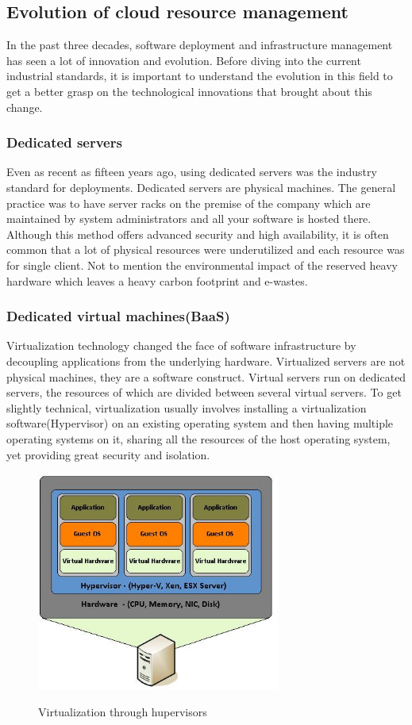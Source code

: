 \documentclass[12pt,titlepage]{article}
\begin{document}
\subsection{Evolution of cloud resource management}
\label{sec:org91b7f4b}
In the past three decades, software deployment and infrastructure management has
seen a lot of innovation and evolution. Before diving into the current
industrial standards, it is important to understand the evolution in this field
to get a better grasp on the technological innovations that brought about this change.


\subsubsection{Dedicated servers}
\label{sec:orgb81bdb6}
Even as recent as fifteen years ago, using dedicated servers was the industry standard for deployments. Dedicated servers
are physical machines. The general practice was to have server racks on the premise
of the company which are maintained by system administrators and all your
software is
hosted there. Although this method offers advanced security and high
availability, it is often common that a lot of physical resources were
underutilized and each resource was for single client. Not to mention the
environmental impact of the reserved heavy hardware which leaves a heavy carbon
footprint and e-wastes.


\subsubsection{Dedicated virtual machines(BaaS)}
\label{sec:org3fd3c95}
Virtualization technology changed the face of software infrastructure by decoupling
applications from the underlying hardware. Virtualized servers are not physical
machines, they are a software construct. Virtual servers run on dedicated
servers, the resources of which are divided between several virtual servers.
To get slightly technical, virtualization usually involves installing a virtualization software(Hypervisor) on an
existing operating system and then having multiple operating systems on it,
sharing all the resources of the host operating system, yet providing
great security and isolation.

\begin{figure}[!h]
    \caption{Virtualization through hupervisors}
    \centering
    \includegraphics[width=80mm]{./thesis_images/virtual_machines.JPG}
    \label{fig:testing the label}
\end{figure}
\end{document}
